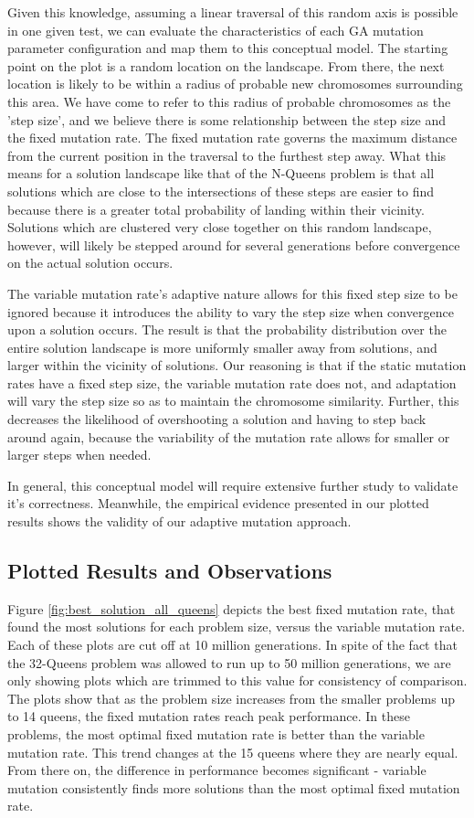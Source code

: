 \documentclass{sig-alternate}
\begin{document}
Given this knowledge, assuming a linear traversal of this random axis is possible in one given test, we can evaluate the characteristics of each GA mutation parameter configuration and map them to this conceptual model. The starting point on the plot is a random location on the landscape. From there, the next location is likely to be within a radius of probable new chromosomes surrounding this area. We have come to refer to this radius of probable chromosomes as the 'step size', and we believe there is some relationship between the step size and the fixed mutation rate. The fixed mutation rate governs the maximum distance from the current position in the traversal to the furthest step away. What this means for a solution landscape like that of the N-Queens problem is that all solutions which are close to the intersections of these steps are easier to find because there is a greater total probability of landing within their vicinity. Solutions which are clustered very close together on this random landscape, however, will likely be stepped around for several generations before convergence on the actual solution occurs.

The variable mutation rate's adaptive nature allows for this fixed step size to be ignored because it introduces the ability to vary the step size when convergence upon a solution occurs. The result is that the probability distribution over the entire solution landscape is more uniformly smaller away from solutions, and larger within the vicinity of solutions. Our reasoning is that if the static mutation rates have a fixed step size, the variable mutation rate does not, and adaptation will vary the step size so as to maintain the chromosome similarity. Further, this decreases the likelihood of overshooting a solution and having to step back around again, because the variability of the mutation rate allows for smaller or larger steps when needed.

In general, this conceptual model will require extensive further study to validate it's correctness. Meanwhile, the empirical evidence presented in our plotted results shows the validity of our adaptive mutation approach.

\subsection{Plotted Results and Observations}
Figure \ref{fig:best_solution_all_queens} depicts the best fixed mutation rate, that found the most solutions for each problem size, versus the variable mutation rate. Each of these plots are cut off at 10 million generations. In spite of the fact that the 32-Queens problem was allowed to run up to 50 million generations, we are only showing plots which are trimmed to this value for consistency of comparison. The plots show that as the problem size increases from the smaller problems up to 14 queens, the fixed mutation rates reach peak performance. In these problems, the most optimal fixed mutation rate is better than the variable mutation rate. This trend changes at the 15 queens where they are nearly equal. From there on, the difference in performance becomes significant - variable mutation consistently finds more solutions than the most optimal fixed mutation rate. 
\end{document}
